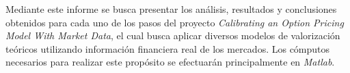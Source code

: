 Mediante este informe se busca presentar los análisis, resultados y conclusiones obtenidos para cada uno de los pasos del proyecto \textit{Calibrating an Option Pricing Model With Market Data}, el cual busca aplicar diversos modelos de valorización teóricos utilizando información financiera real de los mercados. Los cómputos necesarios para realizar este propósito se efectuarán principalmente en \textit{Matlab}.
\newpage